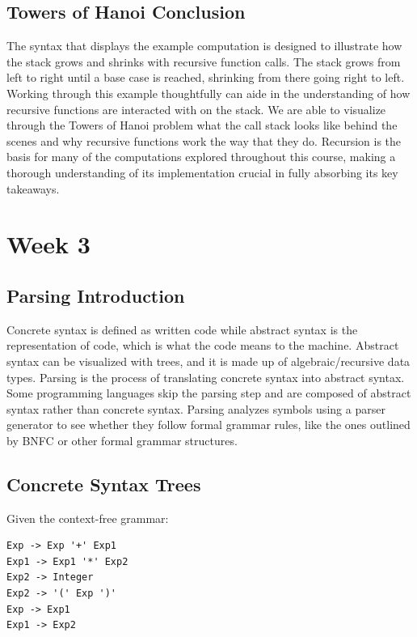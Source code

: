 \documentclass{article}
\theoremstyle{theorem}
\theoremstyle{definition}
\theoremstyle{remark}
\begin{document}
\subsection{Towers of Hanoi Conclusion}

The syntax that displays the example computation is designed to illustrate how the stack grows and shrinks with recursive function calls. The stack grows from left to right until a base case is reached, shrinking from there going right to left. Working through this example thoughtfully can aide in the understanding of how recursive functions are interacted with on the stack. We are able to visualize through the Towers of Hanoi problem what the call stack looks like behind the scenes and why recursive functions work the way that they do. Recursion is the basis for many of the computations explored throughout this course, making a thorough understanding of its implementation crucial in fully absorbing its key takeaways. 

\section{Week 3}

\subsection{Parsing Introduction}

Concrete syntax is defined as written code while abstract syntax is the representation of code, which is what the code means to the machine. Abstract syntax can be visualized with trees, and it is made up of algebraic/recursive data types. Parsing is the process of translating concrete syntax into abstract syntax. Some programming languages skip the parsing step and are composed of abstract syntax rather than concrete syntax. Parsing analyzes symbols using a parser generator to see whether they follow formal grammar rules, like the ones outlined by BNFC or other formal grammar structures. 

\subsection{Concrete Syntax Trees}

Given the context-free grammar: 

\begin{lstlisting}
Exp -> Exp '+' Exp1 
Exp1 -> Exp1 '*' Exp2              
Exp2 -> Integer            
Exp2 -> '(' Exp ')'  
Exp -> Exp1             
Exp1 -> Exp2 
\end{lstlisting}
\end{document}
